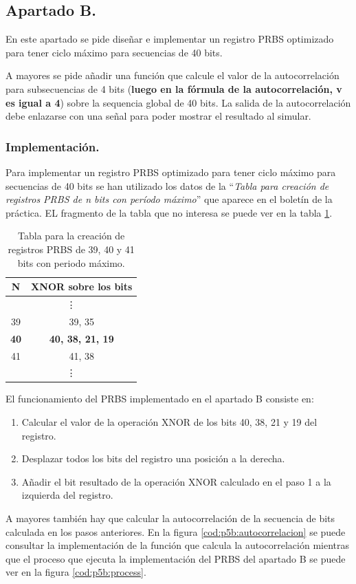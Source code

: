 \documentclass{article}
\begin{document}
\subsection{Apartado B.}

	En este apartado se pide diseñar e implementar un registro PRBS optimizado para tener ciclo máximo para secuencias de 40 bits.
	
	A mayores se pide añadir una función que calcule el valor de la autocorrelación para subsecuencias de 4 bits (\textbf{luego en la fórmula de la autocorrelación, v es igual a 4}) sobre la sequencia global de 40 bits. La salida de la autocorrelación debe enlazarse con una señal para poder mostrar el resultado al simular.

\subsubsection{Implementación.}

	Para implementar un registro PRBS optimizado para tener ciclo máximo para secuencias de 40 bits se han utilizado los datos de la ``\textit{Tabla para creación de registros PRBS de n bits con período máximo}'' que aparece en el boletín de la práctica. EL fragmento de la tabla que no interesa se puede ver en la tabla \ref{tab:p5b:PRBS_max}.

\begin{table}
	\begin{center}
		\begin{tabular}{|c|c|}
\hline
\textbf{N} & \textbf{XNOR sobre los bits} \\ \hline

\multicolumn{2}{c}{\vdots} \\ \hline
39 & 39, 35\\ \hline
\textbf{40} & \textbf{40, 38, 21, 19} \\ \hline
41 & 41, 38\\ \hline
\multicolumn{2}{c}{\vdots} \\ 
		\end{tabular}
		\caption{Tabla para la creación de registros PRBS de 39, 40 y 41 bits con periodo máximo.}
		\label{tab:p5b:PRBS_max}
	\end{center}
\end{table}

El funcionamiento del PRBS implementado en el apartado B consiste en:
\begin{enumerate}
	\item Calcular el valor de la operación XNOR de los bits 40, 38, 21 y 19 del registro.
	\item Desplazar todos los bits del registro una posición a la derecha.
	\item Añadir el bit resultado de la operación XNOR calculado en el paso 1 a la izquierda del registro.
\end{enumerate}
A mayores también hay que calcular la autocorrelación de la secuencia de bits calculada en los pasos anteriores. En la figura \ref{cod:p5b:autocorrelacion} se puede consultar la implementación de la función que calcula la autocorrelación mientras que el proceso que ejecuta la implementación del PRBS del apartado B se puede ver en la figura \ref{cod:p5b:process}.
\end{document}
